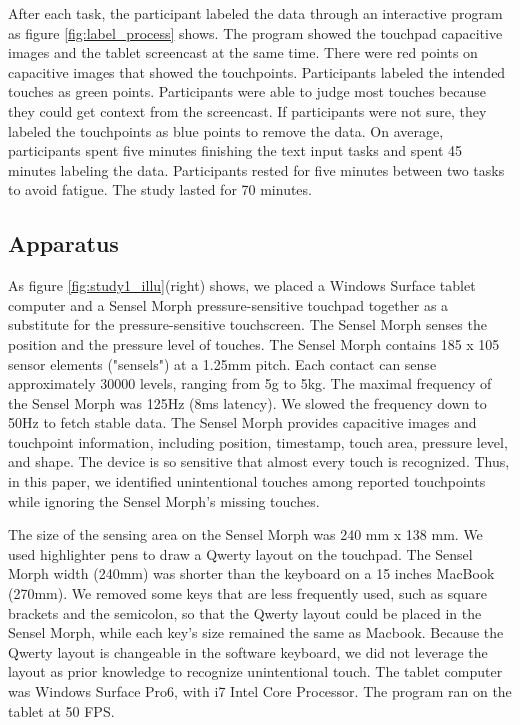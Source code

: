 After each task, the participant labeled the data through an interactive program as figure \ref{fig:label_process} shows. The program showed the touchpad capacitive images and the tablet screencast at the same time. There were red points on capacitive images that showed the touchpoints. Participants labeled the intended touches as green points. Participants were able to judge most touches because they could get context from the screencast. If participants were not sure, they labeled the touchpoints as blue points to remove the data. On average, participants spent five minutes finishing the text input tasks and spent 45 minutes labeling the data. Participants rested for five minutes between two tasks to avoid fatigue. The study lasted for 70 minutes.

\subsection{Apparatus}

As figure \ref{fig:study1_illu}(right) shows, we placed a Windows Surface tablet computer and a Sensel Morph pressure-sensitive touchpad \cite{Website-Morph} together as a substitute for the pressure-sensitive touchscreen. The Sensel Morph senses the position and the pressure level of touches. The Sensel Morph contains 185 x 105 sensor elements ("sensels") at a 1.25mm pitch. Each contact can sense approximately 30000 levels, ranging from 5g to 5kg. The maximal frequency of the Sensel Morph was 125Hz (8ms latency). We slowed the frequency down to 50Hz to fetch stable data. The Sensel Morph provides capacitive images and touchpoint information, including position, timestamp, touch area, pressure level, and shape. The device is so sensitive that almost every touch is recognized. Thus, in this paper, we identified unintentional touches among reported touchpoints while ignoring the Sensel Morph's missing touches.

The size of the sensing area on the Sensel Morph was 240 mm x 138 mm. We used highlighter pens to draw a Qwerty layout on the touchpad. The Sensel Morph width (240mm) was shorter than the keyboard on a 15 inches MacBook (270mm). We removed some keys that are less frequently used, such as square brackets and the semicolon, so that the Qwerty layout could be placed in the Sensel Morph, while each key's size remained the same as Macbook. Because the Qwerty layout is changeable in the software keyboard, we did not leverage the layout as prior knowledge to recognize unintentional touch. The tablet computer was Windows Surface Pro6, with i7 Intel Core Processor. The program ran on the tablet at 50 FPS.

